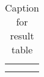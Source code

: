 \begin{table}[t]
    \centering
    \begin{tabular}{c|c}
         &  \\
         & 
    \end{tabular}
    \caption{Caption for result table}
    \label{result_table}
\end{table}